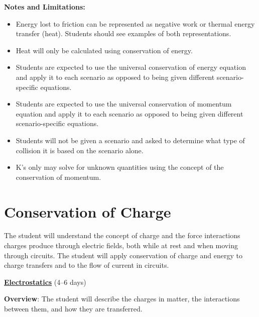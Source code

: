 \documentclass[dvipsnames]{article}
\begin{document}
\textbf{Notes and Limitations:}
\begin{itemize}[topsep=-3pt,itemsep=0pt]
    \item Energy lost to friction can be represented as negative work or  thermal energy transfer (heat). Students should see examples of both representations.
    \item Heat will only be calculated using conservation of energy. 
    \item Students are expected to use the universal conservation of energy equation and apply it to each scenario as opposed to being given different scenario-specific equations.
    \item Students are expected to use the universal conservation of momentum equation and apply it to each scenario as opposed to being given different scenario-specific equations.
    \item Students will not be given a scenario and asked to determine what type of collision it is based on the scenario alone. 
    \item K's only may solve for unknown quantities using the concept of the conservation of momentum.
\end{itemize}



\section{Conservation of Charge}

\vspace{-3pt}
The student will understand the concept of charge and the force interactions charges produce through electric fields, both while at rest and when moving through circuits. The student will apply conservation of charge and energy to charge transfers and to the flow of current in circuits.
\vspace{3pt}

\textbf{\underline{Electrostatics}} (4--6 days)

\textbf{Overview}: The student will describe the charges in matter, the interactions between them, and how they are transferred.
\end{document}

